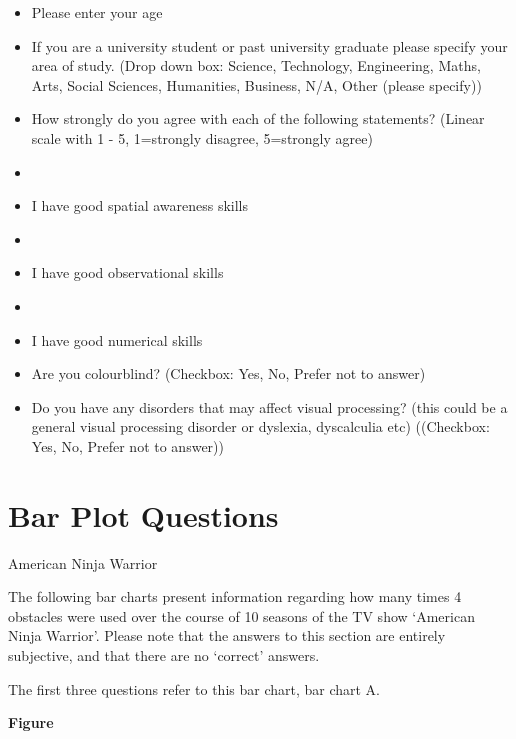 \documentclass[
  12pt,
  twocolumn]{book}
\begin{document}
\begin{itemize}
    \item Please enter your age
    
    \item If you are a university student or past university graduate please specify your area of study. (Drop down box: Science, Technology, Engineering, Maths, Arts, Social Sciences, Humanities, Business, N/A, Other (please specify))

    \item How strongly do you agree with each of the following statements? (Linear scale with 1 - 5, 1=strongly disagree, 5=strongly agree)

    \item\item I have good spatial awareness skills 
    
    \item\item I have good observational skills 
    
    \item\item I have good numerical skills 
    
    \item Are you colourblind? (Checkbox: Yes, No, Prefer not to answer)
    
    \item Do you have any disorders that may affect visual processing? (this could be a general visual processing disorder 
    or dyslexia, dyscalculia etc)
    ((Checkbox: Yes, No, Prefer not to answer))
\end{itemize}

\section{\textbf{Bar Plot Questions}}

American Ninja Warrior\newline

The following bar charts present information regarding how many times 4
obstacles were used over the course of 10 seasons of the TV show
`American Ninja Warrior'. Please note that the answers to this section
are entirely subjective, and that there are no `correct'
answers.\newline

The first three questions refer to this bar chart, bar chart A.

\textbf{Figure}
\end{document}
